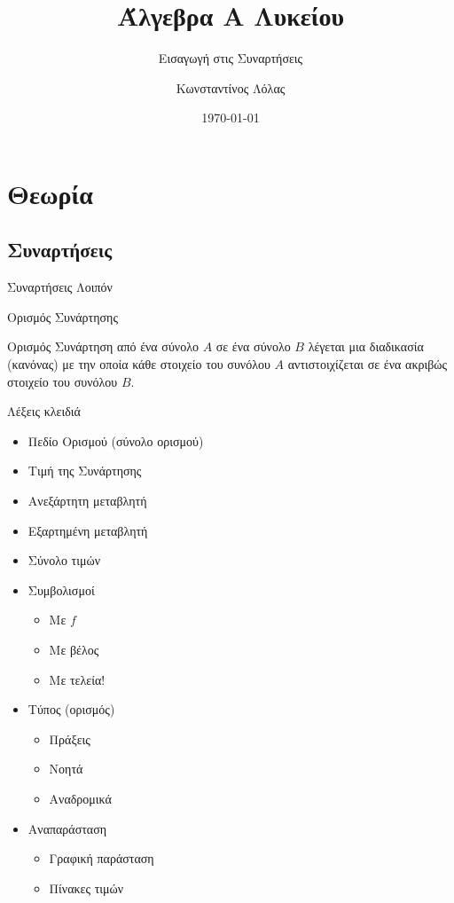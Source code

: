 \documentclass{../../presentation}
\title{Άλγεβρα Α Λυκείου}
\subtitle{Εισαγωγή στις Συναρτήσεις}
\author[Λόλας]{Κωνσταντίνος Λόλας}
\date{\today}
\begin{document}
\frame{\titlepage}

\section{Θεωρία}
\subsection{Συναρτήσεις}

\begin{frame}{Συναρτήσεις Λοιπόν}

\end{frame}

\begin{frame}{Ορισμός Συνάρτησης}

  \begin{block}{Ορισμός}
    Συνάρτηση από ένα σύνολο $Α$ σε ένα σύνολο $Β$ λέγεται μια διαδικασία (κανόνας) με την οποία κάθε στοιχείο του συνόλου $Α$ αντιστοιχίζεται σε ένα ακριβώς στοιχείο του συνόλου $Β$.
  \end{block}
\end{frame}

\begin{frame}
  Λέξεις κλειδιά
  \begin{itemize}[<+->]
    \item Πεδίο Ορισμού (σύνολο ορισμού)
    \item Τιμή της Συνάρτησης
    \item Ανεξάρτητη μεταβλητή
    \item Εξαρτημένη μεταβλητή
    \item Σύνολο τιμών
    \item Συμβολισμοί
          \begin{itemize}[<+->]
            \item Με $f$
            \item Με βέλος
            \item Με τελεία!
          \end{itemize}
    \item Τύπος (ορισμός)
          \begin{itemize}[<+->]
            \item Πράξεις
            \item Νοητά
            \item Αναδρομικά
          \end{itemize}
    \item Αναπαράσταση
          \begin{itemize}[<+->]
            \item Γραφική παράσταση
            \item Πίνακες τιμών
          \end{itemize}
  \end{itemize}
\end{frame}
\end{document}
